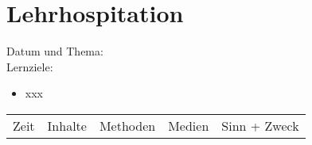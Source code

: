 \documentclass[%
fontsize=12pt,
paper=a4,
oneside,
DIV=11,
BCOR=0cm,
pagesize=automedia,
parskip=false,
headings=normal,
titlepage=true%
]{scrartcl}
\begin{document}
\section{Lehrhospitation}
\clearpage
Datum und Thema:\\
Lernziele:
\begin{itemize}
\item xxx
\end{itemize}

\begin{longtable}{c|c|c|c|c}
Zeit & Inhalte & Methoden & Medien & Sinn + Zweck
\hline
\end{longtable}
\end{document}
